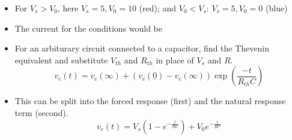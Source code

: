 \documentclass{article}
\begin{document}
\begin{itemize}
    \item For $V_s>V_0$, here $V_s=5, V_0=10$ (red); and $V_0<V_s$: $V_s=5, V_0=0$ (blue)
    \begin{center}
    \end{center}
    \item The current for the conditions would be 
    \begin{center}
    \end{center}
    \item For an arbiturary circuit connected to a capacitor, find the Thevenin equivalent and substitute $V_{th}$ and $R_{th}$ in place of $V_s$ and $R$.
    \begin{equation}
        v_c(t)=v_c(\infty)+(v_c(0)-v_c(\infty))\exp(\frac{-t}{R_{th}C})
    \end{equation}
    \item This can be split into the forced response (first) and the natural response term (second).
    \begin{equation}
        v_c(t)=V_s(1-e^{-\frac{t}{RC}})+V_0e^{-\frac{t}{RC}}
    \end{equation}
\end{itemize}




\end{document}
